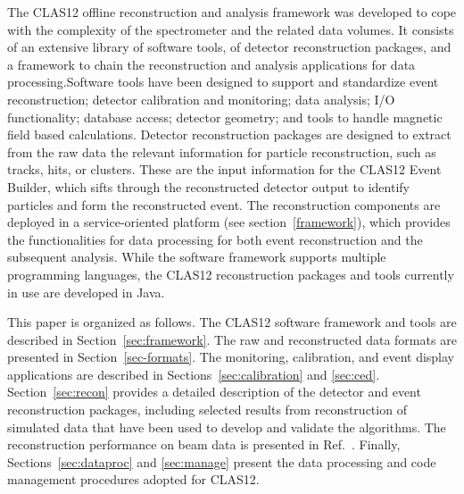 The CLAS12 offline reconstruction and analysis framework was developed to cope with the complexity of the
spectrometer and the related data volumes. It consists of an extensive library of software tools, of detector
reconstruction packages, and a framework to chain the reconstruction and analysis applications for data
processing.Software tools have been designed to
support and standardize event reconstruction; detector
calibration and monitoring; data analysis; I/O functionality; database access; detector geometry; and tools to handle magnetic field based calculations.  Detector reconstruction packages are designed to
extract from the raw data the relevant information for particle reconstruction, such as tracks, hits, or clusters.
These are the input information for the CLAS12 Event Builder, which sifts through the reconstructed detector
output to identify particles and form the reconstructed event. The reconstruction components are deployed in a
service-oriented platform (see section~\ref{framework}), which provides the functionalities for data processing for both event reconstruction
and the subsequent analysis. While the software framework supports multiple programming languages, the CLAS12
reconstruction packages and tools currently in use are developed in Java.

This paper is organized as follows. The CLAS12 software framework and tools are described in
Section~\ref{sec:framework}. The raw and reconstructed data formats are presented in Section~\ref{sec-formats}.
The monitoring, calibration, and event display applications are described in Sections~\ref{sec:calibration} and
\ref{sec:ced}. Section~\ref{sec:recon} provides a detailed description of the detector and event reconstruction
packages, including selected results from reconstruction of simulated data that have been used to develop and
validate the algorithms. The reconstruction performance on beam data is presented in Ref.~\cite{clas12-nim}.
Finally, Sections~\ref{sec:dataproc} and \ref{sec:manage} present the data processing and code management
procedures adopted for CLAS12.
